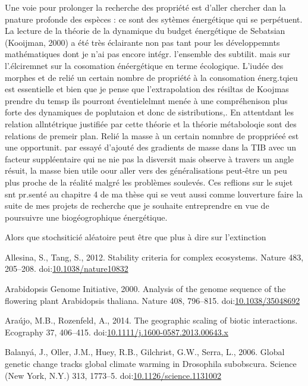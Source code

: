 Une voie pour prolonger la recherche des propriété est d'aller chercher
dan la pnature profonde des espèces : ce sont des sytèmes énergétique
qui se perpétuent. La lecture de la théorie de la dynamique du budget
énergétique de Sebatsian (Kooijman, 2000) a été très éclairante non pas
tant pour les développemnts mathématiques dont je n'ai pas encore
intégr. l'ensemble des subtilit. mais sur l'.élciremnet sur la
cosomation énéergétique en terme écologique. L'iudée des morphes et de
relié un certain nombre de propriété à la consomation énerg.tqieu est
essentielle et bien que je pense que l'extrapolation des résiltas de
Koojmas prendre du temsp ils pourront éventielelmnt menée à une
compréhenison plus forte des dynamiques de poplutaion et donc de
sistributions,. En attentdant les relation allntétrique justifiée par
cette théorie et la théorie métaboloqie sont des relations de premeir
plan. Relié la masse à un certain nomnbre de proppriéeé est une
opportunit. par essayé d'ajouté des gradients de masse dans la TIB avec
un facteur suppléentaire qui ne nie pas la disversit mais observe à
travers un angle résuit, la masse bien utile oour aller vers des
généralisations peut-être un peu plus proche de la réalité malgré les
problèmes soulevés. Ces reflions sur le sujet snt pr.senté au chapitre 4
de ma thèse qui se veut aussi comme louverture faire la suite de mes
projets de recherche que je souhaite entreprendre en vue de poursuivre
une biogéogrophique énergétique.

Alors que stochsiticié aléatoire peut être que plus à dire sur
l'extinction

\hypertarget{refs}{}
\hypertarget{ref-Allesina2012a}{}
Allesina, S., Tang, S., 2012. Stability criteria for complex ecosystems.
Nature 483, 205--208.
doi:\href{https://doi.org/10.1038/nature10832}{10.1038/nature10832}

\hypertarget{ref-TheArabidopsisGenomeInitiative2000}{}
Arabidopsis Genome Initiative, 2000. Analysis of the genome sequence of
the flowering plant Arabidopsis thaliana. Nature 408, 796--815.
doi:\href{https://doi.org/10.1038/35048692}{10.1038/35048692}

\hypertarget{ref-Araujo2014}{}
Araújo, M.B., Rozenfeld, A., 2014. The geographic scaling of biotic
interactions. Ecography 37, 406--415.
doi:\href{https://doi.org/10.1111/j.1600-0587.2013.00643.x}{10.1111/j.1600-0587.2013.00643.x}

\hypertarget{ref-Balanya2006}{}
Balanyá, J., Oller, J.M., Huey, R.B., Gilchrist, G.W., Serra, L., 2006.
Global genetic change tracks global climate warming in Drosophila
subobscura. Science (New York, N.Y.) 313, 1773--5.
doi:\href{https://doi.org/10.1126/science.1131002}{10.1126/science.1131002}

